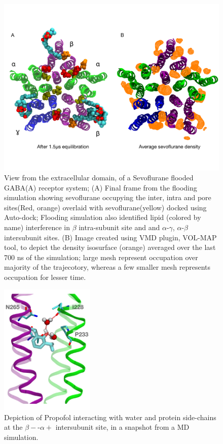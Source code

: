 \documentclass[12pt]{article}
\begin{document}
\begin{figure}
\begin{center}
\centering
\includegraphics[width = 1\textwidth]{finlpics/sevVolMap}
\caption{View from the extracellular domain, of a Sevoflurane flooded GABA(A) receptor system; (A) Final frame from the flooding simulation  showing sevoflurane occupying the inter, intra and pore sites(Red, orange) overlaid with sevoflurane(yellow) docked using Auto-dock; Flooding simulation also identified lipid (colored by name) interference in $\beta$ intra-subunit site and and $\alpha$-$\gamma$, $\alpha$-$\beta$ intersubunit sites. (B) Image created using VMD plugin, VOL-MAP tool, to depict the density isosurface (orange)  averaged over the last 700 ns of the simulation; large mesh represent occupation over majority of the trajecotory, whereas a few smaller mesh represents occupation for lesser time.}
\label{fig:sevVolMap}
\end{center}
\end{figure}

\begin{figure}
\begin{center}
\centering
\includegraphics[width = 0.4\textwidth]{finlpics/PFL_hbonds}
\caption{Depiction of Propofol interacting with water and protein side-chains at the $\beta-$-$\alpha+$ intersubunit site, in a snapshot from a MD simulation.}
\label{fig:PFLhbond}
\end{center}
\end{figure}
\end{document}
